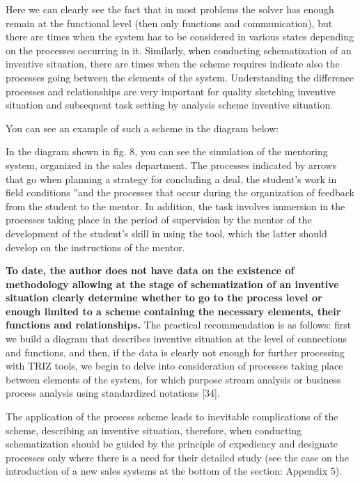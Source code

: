 Here we can clearly see the fact that in most problems the solver has enough
remain at the functional level (then only functions and communication), but
there are times when the system has to be considered in various states
depending on the processes occurring in it. Similarly, when conducting
schematization of an inventive situation, there are times when the scheme
requires indicate also the processes going between the elements of the
system. Understanding the difference processes and relationships are very
important for quality sketching inventive situation and subsequent task
setting by analysis scheme inventive situation.

You can see an example of such a scheme in the diagram below:


In the diagram shown in fig. 8, you can see the simulation of the mentoring
system, organized in the sales department. The processes indicated by arrows
that go when planning a strategy for concluding a deal, the student’s work in
field conditions ”and the processes that occur during the organization of
feedback from the student to the mentor. In addition, the task involves
immersion in the processes taking place in the period of supervision by the
mentor of the development of the student's skill in using the tool, which the
latter should develop on the instructions of the mentor.

\textbf{To date, the author does not have data on the existence of methodology
  allowing at the stage of schematization of an inventive situation clearly
  determine whether to go to the process level or enough limited to a scheme
  containing the necessary elements, their functions and relationships.}  The
practical recommendation is as follows: first we build a diagram that
describes inventive situation at the level of connections and functions, and
then, if the data is clearly not enough for further processing with TRIZ
tools, we begin to delve into consideration of processes taking place between
elements of the system, for which purpose stream analysis or business process
analysis using standardized notations [34].

The application of the process scheme leads to inevitable complications of the
scheme, describing an inventive situation, therefore, when conducting
schematization should be guided by the principle of expediency and designate
processes only where there is a need for their detailed study (see the case on
the introduction of a new sales systems at the bottom of the section: Appendix
5).

